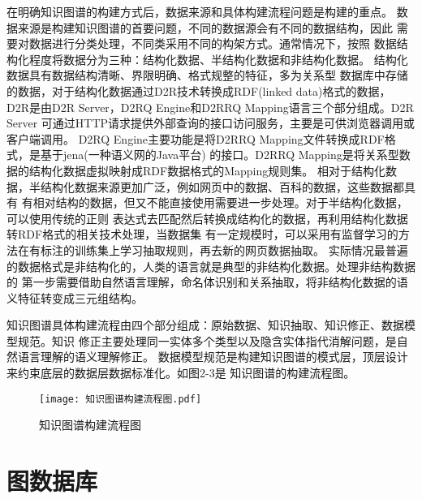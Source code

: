 \documentclass{standalone}
\begin{document}
在明确知识图谱的构建方式后，数据来源和具体构建流程问题是构建的重点。
数据来源是构建知识图谱的首要问题，不同的数据源会有不同的数据结构，因此
需要对数据进行分类处理，不同类采用不同的构架方式。通常情况下，按照
数据结构化程度将数据分为三种：结构化数据、半结构化数据和非结构化数据。
结构化数据具有数据结构清晰、界限明确、格式规整的特征，多为关系型
数据库中存储的数据，对于结构化数据通过D2R技术转换成RDF(linked data)格式的数据，
D2R是由D2R Server，D2RQ Engine和D2RRQ Mapping语言三个部分组成。D2R Server
可通过HTTP请求提供外部查询的接口访问服务，主要是可供浏览器调用或客户端调用。
D2RQ Engine主要功能是将D2RRQ Mapping文件转换成RDF格式，是基于jena(一种语义网的Java平台)
的接口。D2RRQ Mapping是将关系型数据的结构化数据虚拟映射成RDF数据格式的Mapping规则集。
相对于结构化数据，半结构化数据来源更加广泛，例如网页中的数据、百科的数据，这些数据都具有
有相对结构的数据，但又不能直接使用需要进一步处理。对于半结构化数据，可以使用传统的正则
表达式去匹配然后转换成结构化的数据，再利用结构化数据转RDF格式的相关技术处理，当数据集
有一定规模时，可以采用有监督学习的方法在有标注的训练集上学习抽取规则，再去新的网页数据抽取。
实际情况最普遍的数据格式是非结构化的，人类的语言就是典型的非结构化数据。处理非结构数据的
第一步需要借助自然语言理解，命名体识别和关系抽取，将非结构化数据的语义特征转变成三元组结构。

知识图谱具体构建流程由四个部分组成：原始数据、知识抽取、知识修正、数据模型规范。知识
修正主要处理同一实体多个类型以及隐含实体指代消解问题，是自然语言理解的语义理解修正。
数据模型规范是构建知识图谱的模式层，顶层设计来约束底层的数据层数据标准化。如图2-3是
知识图谱的构建流程图。
\begin{figure}[htbp]
	\texttt{[image: 知识图谱构建流程图.pdf]}
	\caption{知识图谱构建流程图}
	\label{知识图谱构建流程图}
\end{figure}
\section{图数据库}
\end{document}
